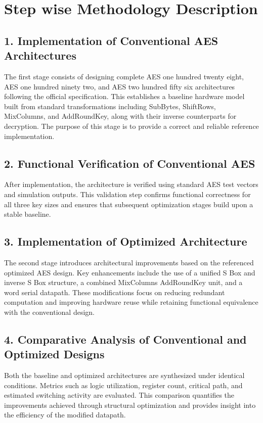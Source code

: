 \section{Step wise Methodology Description}

\subsection*{1. Implementation of Conventional AES Architectures}

The first stage consists of designing complete AES one hundred twenty eight, AES one hundred ninety two, and 
AES two hundred fifty six architectures following the official specification. This establishes a 
baseline hardware model built from standard transformations including SubBytes, ShiftRows, 
MixColumns, and AddRoundKey, along with their inverse counterparts for decryption. The 
purpose of this stage is to provide a correct and reliable reference implementation.

\subsection*{2. Functional Verification of Conventional AES}

After implementation, the architecture is verified using standard AES test vectors and simulation 
outputs. This validation step confirms functional correctness for all three key sizes and ensures 
that subsequent optimization stages build upon a stable baseline.

\subsection*{3. Implementation of Optimized Architecture}

The second stage introduces architectural improvements based on the referenced optimized 
AES design. Key enhancements include the use of a unified S Box and inverse S Box 
structure, a combined MixColumns AddRoundKey unit, and a word serial datapath. These 
modifications focus on reducing redundant computation and improving hardware reuse while 
retaining functional equivalence with the conventional design.

\subsection*{4. Comparative Analysis of Conventional and Optimized Designs}

Both the baseline and optimized architectures are synthesized under identical conditions. 
Metrics such as logic utilization, register count, critical path, and estimated switching activity 
are evaluated. This comparison quantifies the improvements achieved through structural 
optimization and provides insight into the efficiency of the modified datapath.

